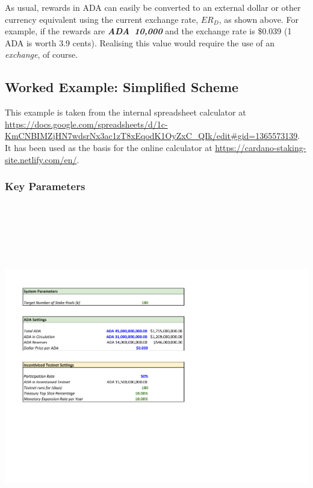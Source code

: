 \documentclass[11pt,a4paper,dvipsnames,twosided,final]{article}
\newcommand{\ada}{ADA{}}
\newcommand{\ADA}[1]{\textbf{\emph{\ada~{#1}}}}
\begin{document}
\noindent
As usual, rewards in \ada{} can easily be converted to an external dollar or other currency equivalent using
the current exchange rate, $ER_D$, as shown %
above.  For example, if the rewards are \ADA{10,000} and the exchange rate is
\$0.039 (1 \ada{} is worth 3.9 cents).  Realising this value would require the use of an \emph{exchange},
of course.

\clearpage
\subsection{Worked Example: Simplified Scheme}


\begin{minipage}{\textwidth}
  This example is taken from the internal \IOHK{} spreadsheet calculator at
\url{https://docs.google.com/spreadsheets/d/1c-KmCNBIMZjHN7wdsrNx3ac1zT8xEqodK1OyZxC_QIk/edit#gid=1365573139}.
It has been used as the basis for the online calculator at \url{https://cardano-staking-site.netlify.com/en/}.

\subsubsection*{Key Parameters}

\noindent
\vspace{-0.5in}
\includegraphics[height=6in]{RCT1.pdf}
\vspace{-2in}


\end{minipage}
\end{document}
